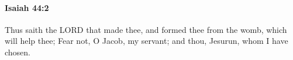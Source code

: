 
		\paragraph{Isaiah 44:2} %
			\label{ISAIAH-44-2}

			Thus saith the LORD that made thee, and formed thee from the womb, which will help thee; Fear not, O Jacob, my servant; and thou, Jesurun, whom I have chosen.


